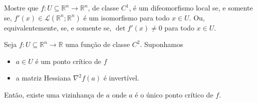 \begin{exer}
	Mostre que $f: U \subseteq \mathbb{R}^n \to \mathbb{R}^n$, de classe $C^1$, é um difeomorfismo local se, e somente se, $f'(x) \in \mathcal{L}(\mathbb{R}^n; \mathbb{R}^n)$ é um isomorfismo para todo $x \in U$. Ou, equivalentemente, se, e somente se, $\det f'(x) \neq 0$ para todo $x \in U$.
\end{exer}

\begin{exer}
	Seja $f: U \subseteq \mathbb{R}^n \to \mathbb{R}$ uma função de classe $C^2$. Suponhamos
	\begin{itemize}
		\item $a \in U$ é um ponto crítico de $f$
		\item a matriz Hessiana $\nabla^2 f (a)$ é invertível.
	\end{itemize} Então, existe uma vizinhança de $a$ onde $a$ é o único ponto crítico de $f$.
\end{exer}


